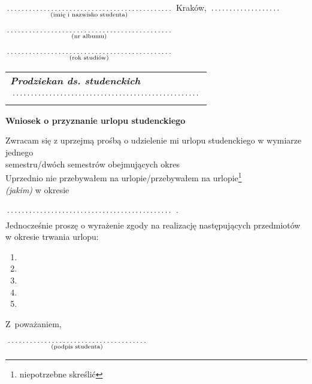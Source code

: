\documentclass[a4paper,8pt]{article}
\newcommand{\fillField}[2]{
    $\underset{\text{#1}}{\parbox[t]{#2}{\dotfill}}$
}
\begin{document}
\noindent
\fillField{(imię i nazwisko studenta)}{7cm} \hfill Kraków, \fillField{}{3cm}\\\\
\fillField{(nr albumu)}{7cm} \\\\
\fillField{(rok studiów)}{7cm} \\


\phantom{a}\hfill
\begin{tabular}[c]{@{}l@{}}
\textit{\textbf{Prodziekan ds. studenckich}} \\\\
\fillField{}{8cm}
\end{tabular}

\vskip 1.5cm

\begin{center}
{\Large \textbf{Wniosek o przyznanie urlopu studenckiego}}
\end{center}

\vskip 0.5cm

\noindent
Zwracam się z uprzejmą prośbą o udzielenie mi urlopu studenckiego w wymiarze
jednego \\semestru/dwóch semestrów obejmujących okres \dotfill\\
Uprzednio nie przebywałem na
urlopie/przebywałem na urlopie\footnote[1]{niepotrzebne skreślić}
\dotfill \\\textit{(jakim)} w okresie
\fillField{}{7cm}.\\

\noindent
Jednocześnie proszę o wyrażenie zgody na realizację następujących przedmiotów
w okresie trwania urlopu:
    \begin{enumerate}
        \item \dotfill
        \item \dotfill
        \item \dotfill
        \item \dotfill
        \item \dotfill
    \end{enumerate}

\vskip 1.3cm

\hspace{\fill} Z~poważaniem, \hspace{3cm} \\\\
\null\hfill \fillField{(podpis studenta)}{6cm} %
\vskip 1.0cm
\end{document}
